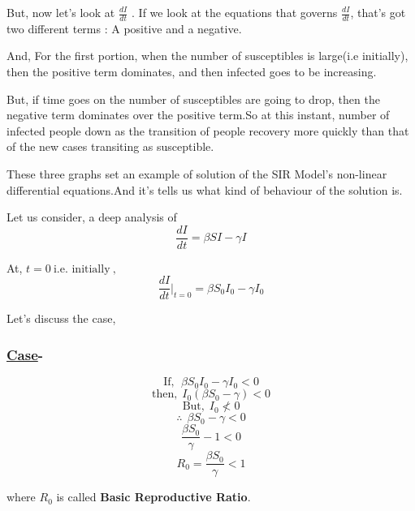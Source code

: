 \documentclass[12pt,a4paper]{article}
\begin{document}
    \vspace*{0.5cm}

    But, now let's look at $\frac{dI}{dt}$ . If we look at the equations that governs $\frac{dI}{dt}$, that's got two different terms : A positive and a negative.
    \vspace*{0.5cm}

    And, For the first portion, when the number of susceptibles is large(i.e initially), then the positive term dominates, and then infected goes to be increasing.
    \vspace*{0.5cm}

    But, if time goes on the number of susceptibles are going to drop, then the negative term dominates over the positive term.So at this instant, number of infected people down as the transition of people recovery more quickly than that of the new cases transiting as susceptible.


    \vspace*{0.3cm}
    
    These three graphs set an example of solution of the SIR Model's non-linear differential equations.And it's tells us what kind of behaviour of the solution is.

    Let us consider, a deep analysis of 
    \[\frac{dI}{dt} = \beta SI - \gamma I\]
    \begin{center}
        At, $t = 0\ \mbox{i.e. initially}\ ,$
        \[\frac{dI}{dt}\bigg|_{t=0} = \beta S_{0}I_{0} - \gamma I_{0}\]
    \end{center} 

    Let's discuss the case,

    \vspace*{0.2cm}
    \subsubsection*{\underline{{\bf Case}}-}

    \begin{center}
        \[\mbox{If},\ \ \beta S_{0} I_{0} - \gamma I_{0} < 0\]
        \[\mbox{then,}\ \ I_{0}\left(\beta S_{0} - \gamma\right) < 0\]
        \[\mbox{But,}\ \ I_{0} \not < 0\]
        \[\therefore\ \ \beta S_{0} - \gamma < 0\] 
        \[\frac{\beta S_{0}}{\gamma} - 1 < 0\]
        \[\boxed{R_{0} = \frac{\beta S_0}{\gamma} < 1}\]
    \end{center}

    where $R_{0}$ is called {\bf Basic Reproductive Ratio}.
    \vspace*{0.2cm}
\end{document}
